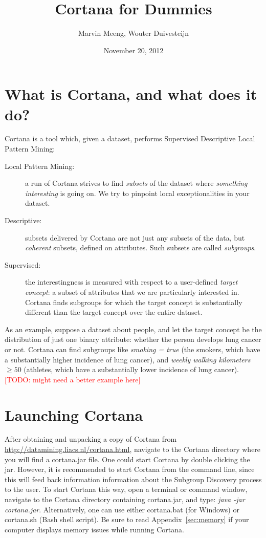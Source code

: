 \documentclass{article}
\title{Cortana for Dummies}
\author{Marvin Meeng, Wouter Duivesteijn}
\date{November 20, 2012}
\newcommand{\todo}[1]{\textcolor{red}{[TODO: #1]}}
\begin{document}
\maketitle

\section{What is Cortana, and what does it do?}

Cortana is a tool which, given a dataset, performs Supervised Descriptive
Local Pattern Mining:
\begin{description}
\item[Local Pattern Mining:] a run of Cortana strives to find \emph{subsets}
of the dataset where \emph{something interesting} is going on. We try to
pinpoint local exceptionalities in your dataset.
\item[Descriptive:] subsets delivered by Cortana are not just any subsets of
the data, but \emph{coherent} subsets, defined on attributes. Such subsets
are called \emph{subgroups}.
\item[Supervised:] the interestingness is measured with respect to a
user-defined \emph{target concept}: a subset of attributes that we are
particularly interested in. Cortana finds subgroups for which the target
concept is substantially different than the target concept over the entire
dataset.
\end{description}

As an example,
suppose a dataset about people, and let the target concept be the
distribution of just one binary attribute: whether the person develops lung
cancer or not.  Cortana can find subgroups like \emph{smoking = true} (the
smokers, which have a substantially higher incidence of lung cancer), and
\emph{weekly walking kilometers} $\geq 50$ (athletes, which have a
substantially lower incidence of lung cancer).
\todo{might need a better example here}

\section{Launching Cortana}

After obtaining and unpacking a copy of Cortana from
\url{http://datamining.liacs.nl/cortana.html}, navigate to the Cortana
directory where you will find a cortana.jar file.  One could start Cortana
by double clicking the jar.  However, it is recommended to start Cortana
from the command line, since this will feed back information information
about the Subgroup Discovery process to the user.  To start Cortana this
way, open a terminal or command window, navigate to the Cortana directory
containing cortana.jar, and type: \emph{java -jar cortana.jar}. 
Alternatively, one can use either cortana.bat (for Windows) or cortana.sh
(Bash shell script).  Be sure to read Appendix~\ref{sec:memory} if your
computer displays memory issues while running Cortana.
\end{document}
